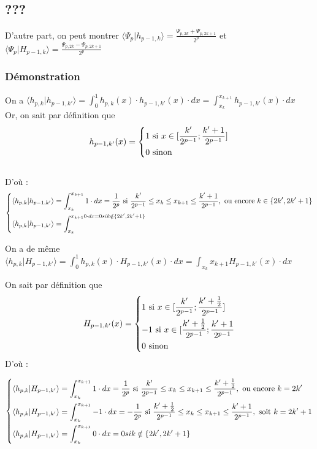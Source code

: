 \documentclass{article}
\begin{document}
\subsection{???}

D'autre part, on peut montrer $\displaystyle \langle{}\Psi{}_{p}|h_{p-1,k}\rangle = \frac{\Psi{}_{p,2k} + \Psi{}_{p,2k + 1} }{2^p}$ et $\displaystyle \langle{}\Psi{}_{p}|H_{p-1,k}\rangle = \frac{\Psi{}_{p,2k} - \Psi{}_{p,2k + 1} }{2^p}$ \\


\subsubsection{Démonstration} 

On a $\displaystyle \langle{}h_{p,k}|h_{p-1,k'}\rangle = \int_0^1 h_{p,k}(x)\cdot{}h_{p-1,k'}(x)\cdot{}dx = \int_{x_k}^{x_{k+1}}h_{p-1,k'}(x)\cdot{}dx$ \\

Or, on sait par définition que \[ h_{p-1,k'}(x)= \begin{dcases} 1 \text{ si }x \in [\frac{k'}{2^{p-1}};\frac{k'+1}{2^{p-1}}] \\
0 \text{ sinon } \end{dcases} \]\\
D'où :
\[ \begin{dcases}
\langle{}h_{p,k}|h_{p-1,k'}\rangle = \int_{x_k}^{x_{k+1}}1\cdot{}dx
= \frac{1}{2^p} \text{ si } \frac{k'}{2^{p-1}} \leq x_k \leq x_{k+1} \leq \frac{k'+1}{2^{p-1}}, \text{ ou encore } k \in \{2k',2k'+1\}\\ 
\langle{}h_{p,k}|h_{p-1,k'}\rangle = \int_{x_k}^{x_{k+1}0\cdot{}dx = 0 si k \notin \{2k',2k'+1\}}
\end{dcases} \]

On a de même \\
 $\displaystyle \langle{}h_{p,k}|H_{p-1,k'}\rangle = \int_0^{1}h_{p,k}(x)\cdot{}H_{p-1,k'}(x)\cdot{}dx = \int_{x_k}^{}x_{k+1}H_{p-1,k'}(x)\cdot{}dx$

On sait par définition que \[ H_{p-1,k'}(x) = \begin{dcases} 
1 \text{ si } x \in [\frac{k'}{2^{p-1}};\frac{k'+\frac{1}{2}}{2^{p-1}}] \\
-1 \text{ si } x \in [\frac{k'+\frac{1}{2}}{2^{p-1}};\frac{k'+1}{2^{p-1}} \\
0 \text{ sinon }
\end{dcases}
\] D'où :

\[ \begin{dcases}
\langle{}h_{p,k}|H_{p-1,k'}\rangle = \int_{x_k}^{x_{k+1}}1\cdot{}dx = \frac{1}{2^p} \text{ si } \frac{k'}{2^{p-1}} \leq x_k \leq x_{k+1} \leq \frac{k'+\frac{1}{2}}{2^{p-1}}, \text{ ou encore } k = 2k' \\
\langle{}h_{p,k}|H_{p-1,k'}\rangle = \int_{x_k}^{x_{k+1}}-1\cdot{}dx = -\frac{1}{2^p} \text{ si } \frac{k'+\frac{1}{2}}{2^{p-1}} \leq x_k \leq x_{k+1} \leq \frac{k'+1}{2^{p-1}}, \text{ soit } k = 2k'+1 \\
\langle{}h_{p,k}|H_{p-1,k'}\rangle = \int_{x_k}^{x_{k+1}}0\cdot{}dx = 0 si k \notin \{2k',2k'+1\}
\end{dcases}
\]
\end{document}
